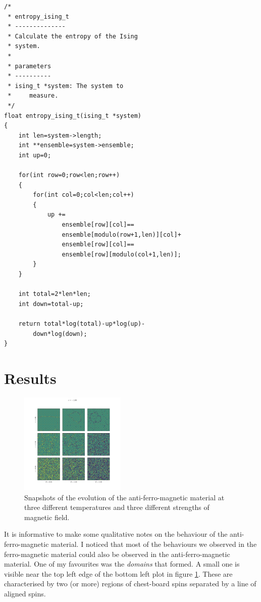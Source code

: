 \documentclass[a4paper, twocolumn]{article}
\begin{document}
\begin{lstlisting}
/*
 * entropy_ising_t
 * --------------
 * Calculate the entropy of the Ising 
 * system. 
 *
 * parameters
 * ----------
 * ising_t *system: The system to 
 *     measure. 
 */
float entropy_ising_t(ising_t *system)
{
    int len=system->length;
    int **ensemble=system->ensemble;
    int up=0;

    for(int row=0;row<len;row++)
    {
        for(int col=0;col<len;col++)
        {
            up += 
                ensemble[row][col]==
                ensemble[modulo(row+1,len)][col]+
                ensemble[row][col]==
                ensemble[row][modulo(col+1,len)];
        }
    }
        
    int total=2*len*len;
    int down=total-up;

    return total*log(total)-up*log(up)-
        down*log(down);
}
\end{lstlisting}


\section*{Results}
\begin{figure}[h]
    \centering
    \includegraphics[width=0.45\textwidth]{pub/figures/external_field_epsilon_minus_one.pdf}
    \caption{Snapshots of the evolution of the anti-ferro-magnetic %
        material at three different temperatures and three different %
        strengths of magnetic field.}
    \label{fig:8}
\end{figure}


It is informative to make some qualitative notes on the behaviour of the %
anti-ferro-magnetic material. I noticed that most of the behaviours %
we observed in the ferro-magnetic material could also be observed %
in the anti-ferro-magnetic material. One of my favourites was the %
\emph{domains} that formed. A small one is visible near the top left %
edge of the bottom left plot in figure \ref{fig:8}. These are %
characterised by two (or more) regions of chest-board spins separated %
by a line of aligned spins.
\end{document}
